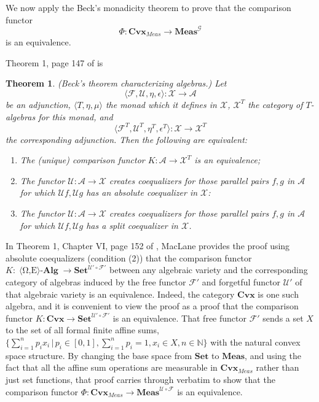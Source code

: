 \documentclass[11pt]{amsart}    %
\newtheorem{theorem}{Theorem}
\newcommand{\be}{\begin{equation}}
\newcommand{\ee}{\end{equation}}
\newcommand{\A}{\mathcal{A}}
\newcommand{\F}{\mathcal{F}}
\newcommand{\G}{\mathcal{G}}
\newcommand{\U}{\mathcal{U}}
\newcommand{\X}{\mathcal{X}}
\begin{document}
We now apply the Beck's monadicity theorem   to prove that the comparison functor
\be \nonumber
\Phi : \mathbf{Cvx}_{Meas} \rightarrow \mathbf{Meas}^{\G}
\ee
is an equivalence. 

  Theorem 1, page 147 of \cite{CWM} is
\begin{theorem} (Beck's theorem characterizing algebras.)   Let
$$
\langle \F, \U, \eta, \epsilon \rangle: \mathcal{X} \rightarrow \mathcal{A}
$$
be an adjunction, $\langle T, \eta, \mu \rangle$ the monad which it defines in $\mathcal{X}$, 
$\mathcal{X}^T$ the category of $T$-algebras for this monad, and
$$
\langle \F^T, \U^T, \eta^T, \epsilon^T \rangle: \mathcal{X} \rightarrow \mathcal{X}^T
$$
the corresponding adjunction.  Then the following are equivalent:
\begin{enumerate}
\item The (unique) comparison functor $K: \mathcal{A} \rightarrow \mathcal{X}^T$ is an equivalence;
\item The functor $\mathcal{U}: \mathcal{A} \rightarrow \mathcal{X}$ creates coequalizers for those parallel pairs $f,g$ in $\mathcal{A}$ for which $\mathcal{U}f, \mathcal{U}g$ has an absolute coequalizer in $\X$:
\item The functor $\mathcal{U}: \A \rightarrow \X$ creates coequalizers for those parallel pairs $f,g$ in $\A$ for which $\U{f}, \U{g}$ has a split coequalizer in $\X$.
\end{enumerate}
\end{theorem}

  In Theorem 1, Chapter VI, page 152 of \cite{CWM}, MacLane provides the proof using absolute coequalizers (condition (2))  that the comparison functor $K:\operatorname{ \langle \Omega, E \rangle-\mathbf{Alg}} \rightarrow \mathbf{Set}^{\mathcal{U}'\circ \mathcal{F}'}$ between any algebraic variety and the corresponding category of algebras induced by the free functor $\mathcal{F}'$ and forgetful functor $\mathcal{U}'$ of that algebraic variety is an equivalence.  Indeed, the category $\mathbf{Cvx}$ is one such algebra, and it is convenient to view the proof as a proof that the comparison functor $K: \mathbf{Cvx} \rightarrow \mathbf{Set}^{\mathcal{U}'\circ \mathcal{F}'}$ is an equivalence. That free functor $\mathcal{F}'$ sends a set $X$ to the set of all formal finite affine sums, $\{ \sum_{i=1}^n p_i x_i \, | \, p_i \in [0,1], \sum_{i=1}^n p_i =1, x_i \in X, n \in \mathbb{N} \}$ with the natural convex space structure. By changing the base space from $\mathbf{Set}$ to $\mathbf{Meas}$, and using the fact that all the affine sum operations are measurable in $\mathbf{Cvx}_{Meas}$ rather than just set functions, that proof carries through verbatim to show that the comparison functor $\Phi:\mathbf{Cvx}_{Meas} \rightarrow \mathbf{Meas}^{\mathcal{U} \circ \mathcal{F}}$ is an equivalence.
\end{document}
